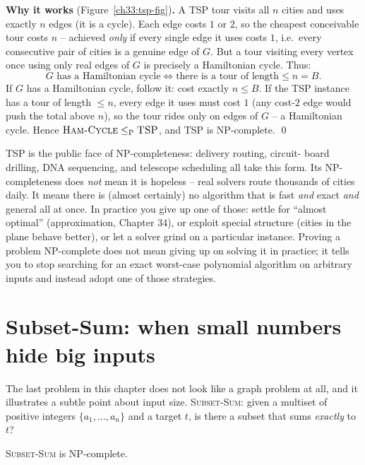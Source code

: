 \textbf{Why it works} (Figure~\ref{ch33:tsp-fig})\textbf{.} A \textsc{TSP} tour
visits all $n$ cities and uses exactly
$n$ edges (it is a cycle). Each edge costs $1$ or $2$, so the cheapest conceivable
tour costs $n$ -- achieved \emph{only} if every single edge it uses costs $1$,
i.e.\ every consecutive pair of cities is a genuine edge of $G$. But a tour
visiting every vertex once using only real edges of $G$ is precisely a
Hamiltonian cycle. Thus:
\[
  G \text{ has a Hamiltonian cycle}
  \iff
  \text{there is a tour of length} \le n=B.
\]
If $G$ has a Hamiltonian cycle, follow it: cost exactly $n\le B$. If the
\textsc{TSP} instance has a tour of length $\le n$, every edge it uses must cost
$1$ (any cost-$2$ edge would push the total above $n$), so the tour rides only on
edges of $G$ -- a Hamiltonian cycle. Hence $\textsc{Ham-Cycle}\le_{\mathrm{P}}\textsc{TSP}$,
and \textsc{TSP} is NP-complete. \qed

\begin{aestheticbox}
\textsc{TSP} is the public face of NP-completeness: delivery routing, circuit-
board drilling, DNA sequencing, and telescope scheduling all take this form. Its
NP-completeness does \emph{not} mean it is hopeless -- real solvers route
thousands of cities daily. It means there is (almost certainly) no algorithm that
is fast \emph{and} exact \emph{and} general all at once. In practice you give up
one of those: settle for ``almost optimal'' (approximation, Chapter 34), or
exploit special structure (cities in the plane behave better), or let a solver
grind on a particular instance. Proving a problem NP-complete does not mean
giving up on solving it in practice; it tells you to stop searching for an exact
worst-case polynomial algorithm on arbitrary inputs and instead adopt one of
those strategies.
\end{aestheticbox}

\section{Subset-Sum: when small numbers hide big inputs}

The last problem in this chapter does not look like a graph problem at all, and
it illustrates a subtle point about input size. \textsc{Subset-Sum}: given a multiset of
positive integers $\{a_1,\dots,a_n\}$ and a target $t$, is there a subset that
sums \emph{exactly} to $t$?

\begin{theorem}
\label{ch33:subset-sum}
\textsc{Subset-Sum} is NP-complete.
\end{theorem}

